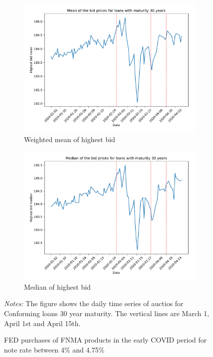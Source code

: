 \documentclass[11pt,a4paper]{article}
\begin{document}
\begin{figure}[h]
\begin{subfigure}[b]{0.49\textwidth}
      \includegraphics[width=0.998\textwidth]{../results/figures/w_winner_bid_mean_mat30_loan1_timeseries_nr_4_4.75.pdf}
      \caption{ Weighted mean of highest bid}
     \end{subfigure}
     \begin{subfigure}[b]{0.49\textwidth}
      \includegraphics[width=0.998\textwidth]{../results/figures/winner_bid_median_mat30_loan1_timeseries_nr_4_4.75.pdf}
      \caption{ Median of highest bid}
     \end{subfigure}
   \caption{FED purchases of FNMA products in the early COVID period for note rate between 4\% and 4.75\%}
   \begin{minipage}{\textwidth}
      \footnotesize{\textit{Notes:} The figure shows the daily time series of auctios for Conforming loans 30 year maturity. The vertical lines are March 1, April 1st and April 15th. } 
      \end{minipage}
\end{figure}
\end{document}
